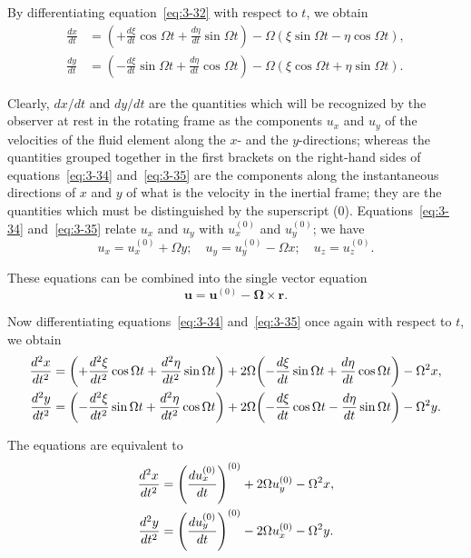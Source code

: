 By differentiating equation~\eqref{eq:3-32} with respect to $t$, we obtain
\begin{align}
\frac{dx}{dt} &= \left(+\frac{d\xi}{dt}\cos\Omega t + \frac{d\eta}{dt}\sin\Omega t\right) - \Omega(\xi\sin\Omega t - \eta\cos\Omega t), \label{eq:3-34}\\
\frac{dy}{dt} &= \left(-\frac{d\xi}{dt}\sin\Omega t + \frac{d\eta}{dt}\cos\Omega t\right) - \Omega(\xi\cos\Omega t + \eta\sin\Omega t). \label{eq:3-35}
\end{align}

Clearly, $dx/dt$ and $dy/dt$ are the quantities which will be recognized by the observer at rest in the rotating frame as the components $u_x$ and $u_y$ of the velocities of the fluid element along the $x$- and the $y$-directions; whereas the quantities grouped together in the first brackets on the right-hand sides of equations~\eqref{eq:3-34} and~\eqref{eq:3-35} are the components along the instantaneous directions of $x$ and $y$ of what is the velocity in the inertial frame; they are the quantities which must be distinguished by the superscript (0). Equations~\eqref{eq:3-34} and~\eqref{eq:3-35} relate $u_x$ and $u_y$ with $u_x^{(0)}$ and $u_y^{(0)}$; we have
\begin{equation}\label{eq:3-36}
u_x = u_x^{(0)} + \Omega y; \quad u_y = u_y^{(0)} - \Omega x; \quad u_z = u_z^{(0)}.
\end{equation}

These equations can be combined into the single vector equation
\begin{equation}\label{eq:3-37}
\mathbf{u} = \mathbf{u}^{(0)} - \boldsymbol{\Omega}\times\mathbf{r}.
\end{equation}

Now differentiating equations~\eqref{eq:3-34} and~\eqref{eq:3-35} once again with respect to $t$, we obtain
\begin{align}
\frac{d^2 x}{dt^2} &= \left(+\frac{d^2\xi}{dt^2}\cos\Omega t + \frac{d^2\eta}{dt^2}\sin\Omega t\right) + 2\Omega\!\left(-\frac{d\xi}{dt}\sin\Omega t + \frac{d\eta}{dt}\cos\Omega t\right) - \Omega^2 x, \label{eq:3-38}\\
\frac{d^2 y}{dt^2} &= \left(-\frac{d^2\xi}{dt^2}\sin\Omega t + \frac{d^2\eta}{dt^2}\cos\Omega t\right) + 2\Omega\!\left(-\frac{d\xi}{dt}\cos\Omega t - \frac{d\eta}{dt}\sin\Omega t\right) - \Omega^2 y. \notag
\end{align}

The equations are equivalent to
\begin{align}
\frac{d^2 x}{dt^2} &= \left(\frac{du_x^{(0)}}{dt}\right)^{(0)} + 2\Omega u_y^{(0)} - \Omega^2 x, \label{eq:3-39}\\
\frac{d^2 y}{dt^2} &= \left(\frac{du_y^{(0)}}{dt}\right)^{(0)} - 2\Omega u_x^{(0)} - \Omega^2 y. \notag
\end{align}

